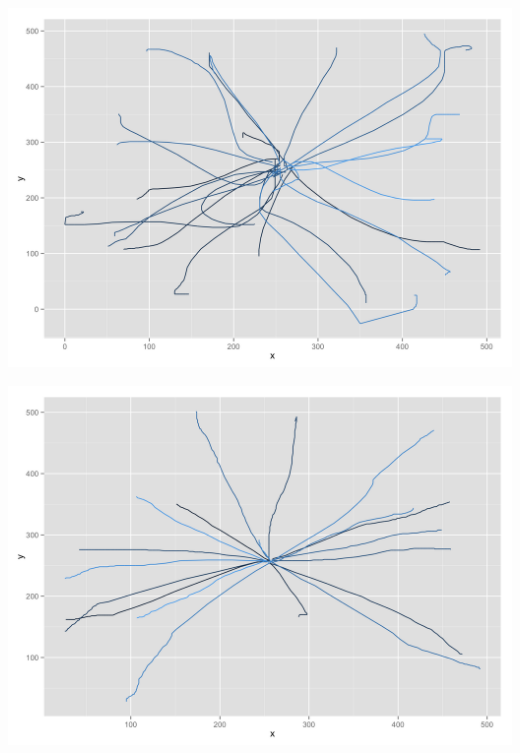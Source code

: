 \begin{appendices}
\begin{minipage}{\textwidth}
\begin{minipage}{0.5\linewidth}
		\includegraphics[width=\linewidth]{images/plots/plot_analysis_qualitative_235}
	\end{minipage}
	\begin{minipage}{0.5\linewidth}
		\includegraphics[width=\linewidth]{images/plots/plot_analysis_qualitative_239}
	\end{minipage}	
	\label{fig:kvaliativ_persons_1}
\end{minipage}


\end{appendices}
